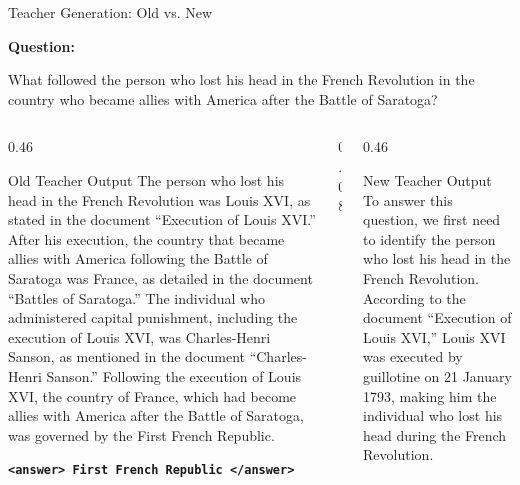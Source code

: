 \begin{frame}{Teacher Generation: Old vs. New}

\tiny

\textbf{Question:}

What followed the person who lost his head in the French Revolution
in the country who became allies with America after the Battle of Saratoga?

\vspace{0.15cm}

\begin{columns}[T,onlytextwidth]

\begin{column}{0.46\textwidth}

\begin{block}{Old Teacher Output}
The person who lost his head in the French Revolution was Louis XVI,
as stated in the document ``Execution of Louis XVI.'' After his execution,
the country that became allies with America following the Battle of
Saratoga was France, as detailed in the document ``Battles of Saratoga.''
The individual who administered capital punishment, including the
execution of Louis XVI, was Charles-Henri Sanson, as mentioned in the
document ``Charles-Henri Sanson.'' Following the execution of Louis XVI,
the country of France, which had become allies with America after the
Battle of Saratoga, was governed by the First French Republic.

\vspace{0.1cm}

\begin{center}
    \textbf{\texttt{<answer> First French Republic </answer>}}
\end{center}
\end{block}

\end{column}

\begin{column}{0.08\textwidth}
\centering
\vspace{3.2cm}
{\Large $\Longrightarrow$}
\end{column}

\begin{column}{0.46\textwidth}

\begin{block}{New Teacher Output}
To answer this question, we first need to identify the person who lost
his head in the French Revolution. According to the document
``Execution of Louis XVI,'' Louis XVI was executed by guillotine on
21 January 1793, making him the individual who lost his head during
the French Revolution.


\end{block}
\end{column}
\end{columns}
\end{frame}
